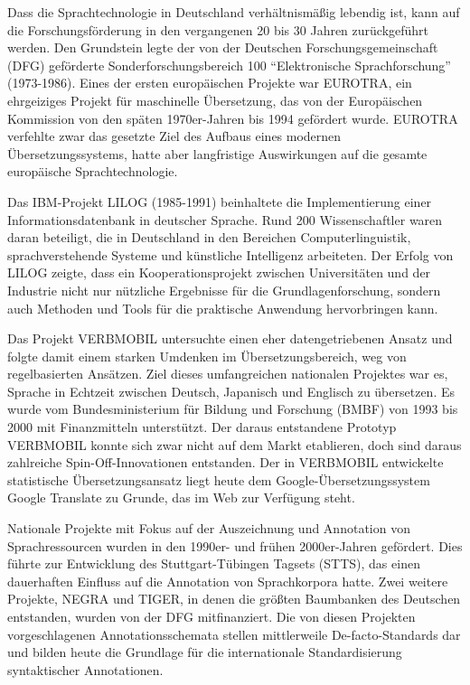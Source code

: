 \begin{multicols}{2}
Dass die Sprachtechnologie in Deutschland verhältnismäßig lebendig ist, kann auf die Forschungsförderung in den vergangenen 20 bis 30 Jahren zurückgeführt werden. Den Grundstein legte der von der Deutschen Forschungsgemeinschaft (DFG) geförderte Sonderforschungsbereich 100 ``Elektronische Sprachforschung'' (1973-1986). Eines der ersten europäischen Projekte war EUROTRA, ein ehrgeiziges Projekt für maschinelle Übersetzung, das von der Europäischen Kommission von den späten 1970er-Jahren bis 1994 gefördert wurde. EUROTRA verfehlte zwar das gesetzte Ziel des Aufbaus eines modernen Übersetzungssystems, hatte aber langfristige Auswirkungen auf die gesamte europäische Sprachtechnologie.

Das IBM-Projekt LILOG (1985-1991) beinhaltete die Implementierung einer Informationsdatenbank in deutscher Sprache. Rund 200 Wissenschaftler waren daran beteiligt, die in Deutschland in den Bereichen Computerlinguistik, sprachverstehende Systeme und künstliche Intelligenz arbeiteten. Der Erfolg von LILOG zeigte, dass ein Kooperationsprojekt zwischen Universitäten und der Industrie nicht nur nützliche Ergebnisse für die Grundlagenforschung, sondern auch Methoden und Tools für die praktische Anwendung hervorbringen kann.

Das Projekt VERBMOBIL untersuchte einen eher datengetriebenen Ansatz und folgte damit einem starken Umdenken im Übersetzungsbereich, weg von regelbasierten Ansätzen. Ziel dieses umfangreichen nationalen Projektes war es, Sprache in Echtzeit zwischen Deutsch, Japanisch und Englisch zu übersetzen. Es wurde vom Bundesministerium für Bildung und Forschung (BMBF) von 1993 bis 2000 mit Finanzmitteln unterstützt. Der daraus entstandene Prototyp VERBMOBIL konnte sich zwar nicht auf dem Markt etablieren, doch sind daraus zahlreiche Spin-Off-In\-no\-va\-tio\-nen entstanden. Der in VERBMOBIL entwickelte statistische Übersetzungsansatz liegt heute dem Google-Über\-set\-zungs\-system Google Translate zu Grunde, das im Web zur Verfügung steht.

Nationale Projekte mit Fokus auf der Auszeichnung und Annotation von Sprachressourcen wurden in den 1990er- und frühen 2000er-Jahren gefördert. Dies führte zur Entwicklung des Stutt\-gart-Tü\-bingen Tag\-sets (STTS), das einen dauerhaften Einfluss auf die Annotation von Sprachkorpora hatte. Zwei weitere Projekte, NEGRA und TIGER, in denen die größten Baumbanken des Deutschen entstanden, wurden von der DFG mitfinanziert. Die von diesen Projekten vorgeschlagenen Annotationsschemata stellen mittlerweile De-facto-Standards dar und bilden heute die Grundlage für die internationale Standardisierung syntaktischer Annotationen.


\end{multicols}
